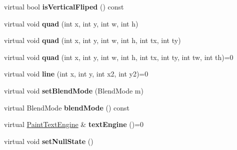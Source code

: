 \begin{DoxyCompactItemize}
\item 
\hypertarget{class_tempest_1_1_painter_device_ab987c6cbe17c794c65c008f667c62561}{virtual bool {\bfseries is\+Vertical\+Fliped} () const }\label{class_tempest_1_1_painter_device_ab987c6cbe17c794c65c008f667c62561}

\item 
\hypertarget{class_tempest_1_1_painter_device_a0f303b9741ab7c8f6a49f136892c85d2}{virtual void {\bfseries quad} (int x, int y, int w, int h)}\label{class_tempest_1_1_painter_device_a0f303b9741ab7c8f6a49f136892c85d2}

\item 
\hypertarget{class_tempest_1_1_painter_device_ade8ffbd89457c67f5eb498a3daf2b273}{virtual void {\bfseries quad} (int x, int y, int w, int h, int tx, int ty)}\label{class_tempest_1_1_painter_device_ade8ffbd89457c67f5eb498a3daf2b273}

\item 
\hypertarget{class_tempest_1_1_painter_device_a2101554db7624978f8b160172c56bba8}{virtual void {\bfseries quad} (int x, int y, int w, int h, int tx, int ty, int tw, int th)=0}\label{class_tempest_1_1_painter_device_a2101554db7624978f8b160172c56bba8}

\item 
\hypertarget{class_tempest_1_1_painter_device_ac980f7e9e99f0d460485c6f2937d11e6}{virtual void {\bfseries line} (int x, int y, int x2, int y2)=0}\label{class_tempest_1_1_painter_device_ac980f7e9e99f0d460485c6f2937d11e6}

\item 
\hypertarget{class_tempest_1_1_painter_device_a3a36adc2fc7d34cb83963fd8a6768ff5}{virtual void {\bfseries set\+Blend\+Mode} (Blend\+Mode m)}\label{class_tempest_1_1_painter_device_a3a36adc2fc7d34cb83963fd8a6768ff5}

\item 
\hypertarget{class_tempest_1_1_painter_device_a9a0c844aa3adc39dea580b4dabad2ca2}{virtual Blend\+Mode {\bfseries blend\+Mode} () const }\label{class_tempest_1_1_painter_device_a9a0c844aa3adc39dea580b4dabad2ca2}

\item 
\hypertarget{class_tempest_1_1_painter_device_a336bd5c45108f2385826b8f1800f604d}{virtual \hyperlink{class_tempest_1_1_paint_text_engine}{Paint\+Text\+Engine} \& {\bfseries text\+Engine} ()=0}\label{class_tempest_1_1_painter_device_a336bd5c45108f2385826b8f1800f604d}

\item 
\hypertarget{class_tempest_1_1_painter_device_a9a1c3222e9489301f1937d4859742d6f}{virtual void {\bfseries set\+Null\+State} ()}\label{class_tempest_1_1_painter_device_a9a1c3222e9489301f1937d4859742d6f}


\end{DoxyCompactItemize}
